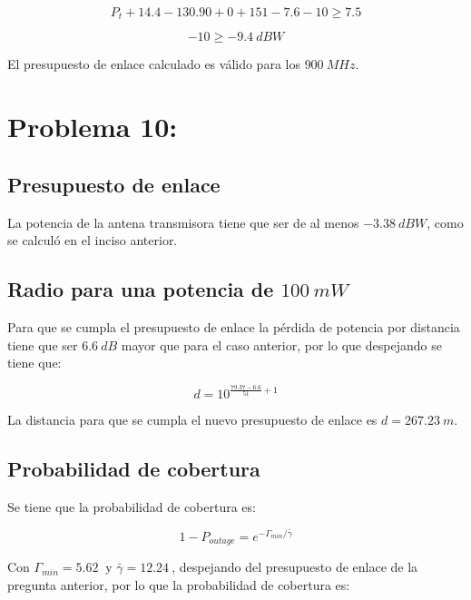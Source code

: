 \documentclass[11pt]{article}
\begin{document}
\begin{equation}
    P_t + 14.4 - 130.90 + 0 + 151 - 7.6 - 10 \geq 7.5
\end{equation}

\begin{equation}
    -10 \geq \SI{-9.4}{dBW}
\end{equation}

El presupuesto de enlace calculado es válido para los \(\SI{900}{MHz}\).

\section*{Problema 10:}

\subsection*{Presupuesto de enlace}

La potencia de la antena transmisora tiene que ser de al menos \(\SI{-3.38}{dBW}\), como se calculó en el inciso anterior.

\subsection*{Radio para una potencia de \(\SI{100}{mW}\)}

Para que se cumpla el presupuesto de enlace la pérdida de potencia por distancia tiene que ser \(\SI{6.6}{dB}\) mayor que para el caso anterior, por lo que despejando se tiene que:

\begin{equation*}
    d = 10^{\frac{79.37- 6.6}{51}+1}
\end{equation*}

La distancia para que se cumpla el nuevo presupuesto de enlace es \(d = \SI{267.23}{m}\).

\subsection*{Probabilidad de cobertura}

Se tiene que la probabilidad de cobertura es:

\begin{equation*}
    1-P_{outage} = e^{-\Gamma_{min}/\bar{\gamma}}
\end{equation*}

Con \(\Gamma_{min} = \SI{5.62}{}\) y \(\bar{\gamma} = \SI{12.24}{}\), despejando del presupuesto de enlace de la pregunta anterior, por lo que la probabilidad de cobertura es:
\end{document}

